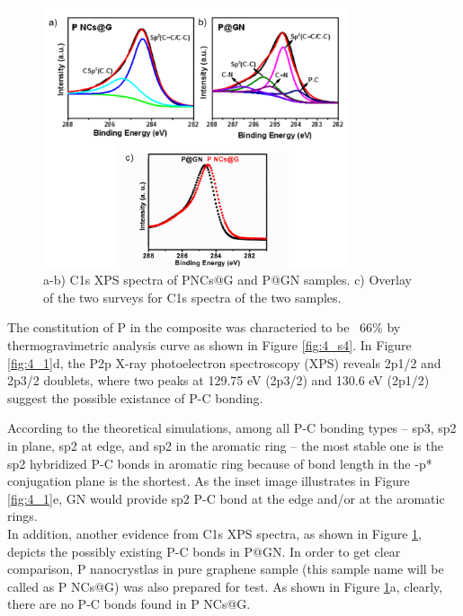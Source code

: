 \begin{figure}[ht]
\centering
\includegraphics[width=0.8\textwidth]{figures/figure4_s5}
\caption[C1s XPS spectra comparison]
{a-b) C1s XPS spectra of PNCs@G and P@GN samples. c) Overlay of the two surveys for C1s spectra of the two samples. 
\label{fig:4_s5}}
\end{figure}

The constitution of P in the composite was characteried to be ~66\% by thermogravimetric analysis curve as shown in Figure \ref{fig:4_s4}. In Figure \ref{fig:4_1}d, the P2p X-ray photoelectron spectroscopy (XPS) reveals 2p1/2 and 2p3/2 doublets, where two peaks at 129.75 eV (2p3/2) and 130.6 eV (2p1/2) suggest the possible existance of P-C bonding.\cite{Jiao2014b,Niu2014b,Zhang2013b} 

According to the theoretical simulations,\cite{Sun2014b,Claeyssens2009b} among all P-C bonding types -- sp3, sp2 in plane, sp2 at edge, and sp2 in the aromatic ring -- the most stable one is the sp2 hybridized P-C bonds in aromatic ring because of bond length in the \pi-p* conjugation plane is the shortest. As the inset image illustrates in Figure \ref{fig:4_1}e, GN would provide sp2 P-C bond at the edge and/or at the aromatic rings. \\

In addition, another evidence from C1s XPS spectra, as shown in Figure \ref{fig:4_s5}, depicts the possibly existing P-C bonds in P@GN. In order to get clear comparison, P nanocrystlas in pure graphene sample (this sample name will be called as P NCs@G) was also prepared for test. As shown in Figure \ref{fig:4_s5}a, clearly, there are no P-C bonds found in P NCs@G. 

